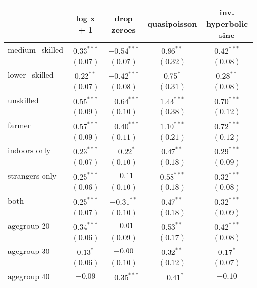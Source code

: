 
\begin{table}
\begin{center}
\begin{tabular}{l c c c c}
\hline
 & log x + 1 & drop zeroes & quasipoisson & inv. hyperbolic sine \\
\hline
medium\_skilled & $0.33^{***}$  & $-0.54^{***}$ & $0.96^{**}$   & $0.42^{***}$  \\
                & $(0.07)$      & $(0.07)$      & $(0.32)$      & $(0.08)$      \\
lower\_skilled  & $0.22^{**}$   & $-0.42^{***}$ & $0.75^{*}$    & $0.28^{**}$   \\
                & $(0.07)$      & $(0.08)$      & $(0.31)$      & $(0.08)$      \\
unskilled       & $0.55^{***}$  & $-0.64^{***}$ & $1.43^{***}$  & $0.70^{***}$  \\
                & $(0.09)$      & $(0.10)$      & $(0.38)$      & $(0.12)$      \\
farmer          & $0.57^{***}$  & $-0.40^{***}$ & $1.10^{***}$  & $0.72^{***}$  \\
                & $(0.09)$      & $(0.11)$      & $(0.21)$      & $(0.12)$      \\
indoors only    & $0.23^{***}$  & $-0.22^{*}$   & $0.47^{**}$   & $0.29^{***}$  \\
                & $(0.07)$      & $(0.10)$      & $(0.18)$      & $(0.09)$      \\
strangers only  & $0.25^{***}$  & $-0.11$       & $0.58^{***}$  & $0.32^{***}$  \\
                & $(0.06)$      & $(0.10)$      & $(0.18)$      & $(0.08)$      \\
both            & $0.25^{***}$  & $-0.31^{**}$  & $0.47^{**}$   & $0.32^{***}$  \\
                & $(0.07)$      & $(0.10)$      & $(0.18)$      & $(0.09)$      \\
agegroup 20     & $0.34^{***}$  & $-0.01$       & $0.53^{**}$   & $0.42^{***}$  \\
                & $(0.06)$      & $(0.09)$      & $(0.17)$      & $(0.08)$      \\
agegroup 30     & $0.13^{*}$    & $-0.00$       & $0.32^{**}$   & $0.17^{*}$    \\
                & $(0.06)$      & $(0.10)$      & $(0.12)$      & $(0.07)$      \\
agegroup 40     & $-0.09$       & $-0.35^{***}$ & $-0.41^{*}$   & $-0.10$       \\

\end{tabular}
\end{center}
\end{table}
